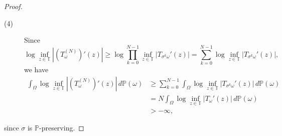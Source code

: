 \documentclass[12pt,reqno]{amsart}
\numberwithin{theorem}{section}
\begin{document}
\begin{proof}
\begin{description}
    \item[(4)] Since $$\log\inf_{z\in\mathbb{T}}|(T_{\omega}^{(N)})'(z)|\ge\log\prod_{k=0}^{N-1}\inf_{z\in\mathbb{T}}|T_{\sigma^{k}\omega}'(z)|=\sum_{k=0}^{N-1}\log\inf_{z\in\mathbb{T}}|T_{\sigma^{k}\omega}'(z)|,$$ we have \begin{align*}\int_{\Omega}\log\inf_{z\in\mathbb{T}}|(T_{\omega}^{(N)})'(z)|\,d\mathbb{P}(\omega)&\ge\sum_{k=0}^{N-1}\int_{\Omega}\log\inf_{z\in\mathbb{T}}|T_{\sigma^{k}\omega}'(z)|\,d\mathbb{P}(\omega)\\&=N\int_{\Omega}\log\inf_{z\in\mathbb{T}}|T_{\omega}'(z)|\,d\mathbb{P}(\omega)\\&>-\infty,\end{align*}\end{description} since $\sigma$ is $\mathbb{P}$-preserving.\end{proof}



\printbibliography
\end{document}
